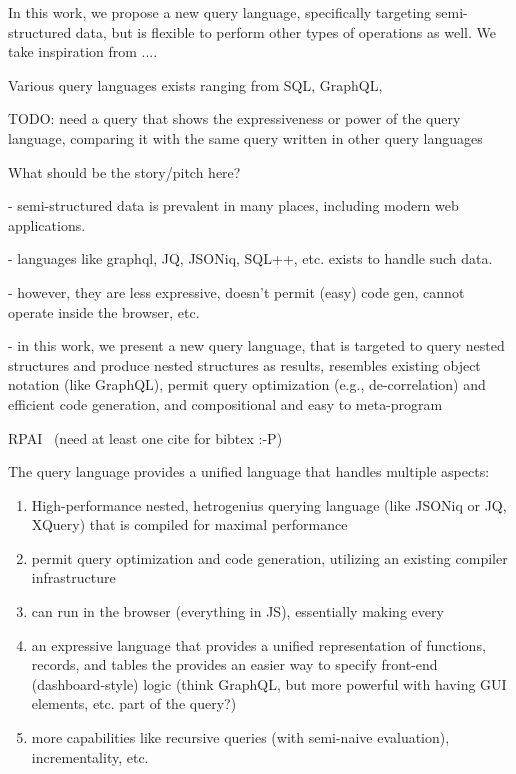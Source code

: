 \documentclass[runningheads]{llncs}
\begin{document}
In this work, we propose a new query language, specifically targeting semi-structured
data, but is flexible to perform other types of operations as well.
We take inspiration from ....



Various query languages exists ranging from SQL, GraphQL, 

TODO: need a query that shows the expressiveness or power of the query language, comparing it with the same query 
written in other query languages

What should be the story/pitch here?

- semi-structured data is prevalent in many places, including modern web applications.

- languages like graphql, JQ, JSONiq, SQL++, etc. exists to handle such data.

- however, they are less expressive, doesn't permit (easy) code gen, cannot operate inside the browser, etc.

- in this work, we present a new query language, that is targeted to query nested structures and produce
nested structures as results, resembles existing object notation (like GraphQL), permit query optimization (e.g., de-correlation)
and efficient code generation, and compositional and easy to meta-program


RPAI~\cite{rpai} (need at least one cite for bibtex :-P)

The query language provides a unified language that handles multiple aspects:

\begin{enumerate}
    \item High-performance nested, hetrogenius querying language (like JSONiq or JQ, XQuery)
    that is compiled for maximal performance

    \item permit query optimization and code generation, utilizing an existing compiler
    infrastructure

    \item can run in the browser (everything in JS), essentially making every 

    \item an expressive language that provides a unified representation of functions,
     records, and tables the provides an easier way to specify front-end (dashboard-style) logic
    (think GraphQL, but more powerful with having GUI elements, etc. part of the query?)
    \item more capabilities like recursive queries (with semi-naive evaluation),
    incrementality, etc.
\end{enumerate}
\end{document}
